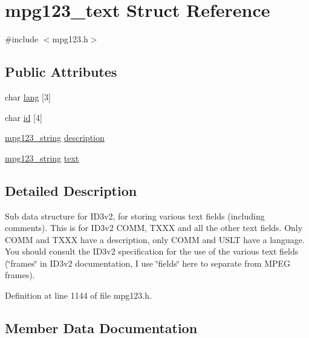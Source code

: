 \hypertarget{structmpg123__text}{}\section{mpg123\+\_\+text Struct Reference}
\label{structmpg123__text}


{\ttfamily \#include $<$mpg123.\+h$>$}

\subsection*{Public Attributes}
\begin{DoxyCompactItemize}
\item 
char \mbox{\hyperlink{structmpg123__text_a19f010dbd07ec10efa80d909768372e6}{lang}} \mbox{[}3\mbox{]}
\item 
char \mbox{\hyperlink{structmpg123__text_a8a75ed97a1d8a019a3944935c1339fdb}{id}} \mbox{[}4\mbox{]}
\item 
\mbox{\hyperlink{structmpg123__string}{mpg123\+\_\+string}} \mbox{\hyperlink{structmpg123__text_afc19e602b7a696d8a0ed03ae6b86f1bf}{description}}
\item 
\mbox{\hyperlink{structmpg123__string}{mpg123\+\_\+string}} \mbox{\hyperlink{structmpg123__text_a574b9464a996281f629858c0216eae18}{text}}
\end{DoxyCompactItemize}


\subsection{Detailed Description}
Sub data structure for I\+D3v2, for storing various text fields (including comments). This is for I\+D3v2 C\+O\+MM, T\+X\+XX and all the other text fields. Only C\+O\+MM and T\+X\+XX have a description, only C\+O\+MM and U\+S\+LT have a language. You should consult the I\+D3v2 specification for the use of the various text fields (\char`\"{}frames\char`\"{} in I\+D3v2 documentation, I use \char`\"{}fields\char`\"{} here to separate from M\+P\+EG frames). 

Definition at line 1144 of file mpg123.\+h.



\subsection{Member Data Documentation}
\mbox{\label{structmpg123__text_afc19e602b7a696d8a0ed03ae6b86f1bf}} 
